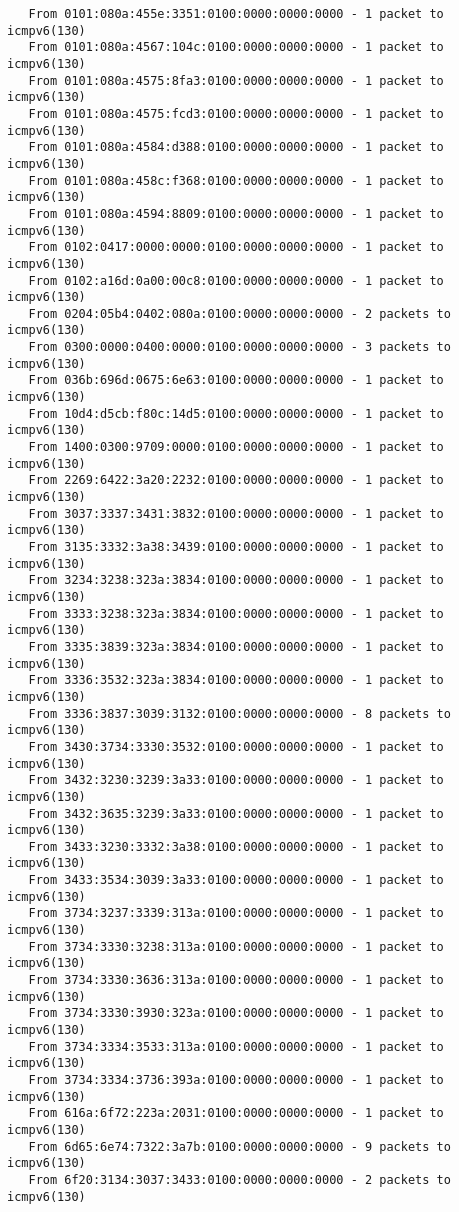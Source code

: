 \begin{lstlisting}
   From 0101:080a:455e:3351:0100:0000:0000:0000 - 1 packet to icmpv6(130)
   From 0101:080a:4567:104c:0100:0000:0000:0000 - 1 packet to icmpv6(130)
   From 0101:080a:4575:8fa3:0100:0000:0000:0000 - 1 packet to icmpv6(130)
   From 0101:080a:4575:fcd3:0100:0000:0000:0000 - 1 packet to icmpv6(130)
   From 0101:080a:4584:d388:0100:0000:0000:0000 - 1 packet to icmpv6(130)
   From 0101:080a:458c:f368:0100:0000:0000:0000 - 1 packet to icmpv6(130)
   From 0101:080a:4594:8809:0100:0000:0000:0000 - 1 packet to icmpv6(130)
   From 0102:0417:0000:0000:0100:0000:0000:0000 - 1 packet to icmpv6(130)
   From 0102:a16d:0a00:00c8:0100:0000:0000:0000 - 1 packet to icmpv6(130)
   From 0204:05b4:0402:080a:0100:0000:0000:0000 - 2 packets to icmpv6(130)
   From 0300:0000:0400:0000:0100:0000:0000:0000 - 3 packets to icmpv6(130)
   From 036b:696d:0675:6e63:0100:0000:0000:0000 - 1 packet to icmpv6(130)
   From 10d4:d5cb:f80c:14d5:0100:0000:0000:0000 - 1 packet to icmpv6(130)
   From 1400:0300:9709:0000:0100:0000:0000:0000 - 1 packet to icmpv6(130)
   From 2269:6422:3a20:2232:0100:0000:0000:0000 - 1 packet to icmpv6(130)
   From 3037:3337:3431:3832:0100:0000:0000:0000 - 1 packet to icmpv6(130)
   From 3135:3332:3a38:3439:0100:0000:0000:0000 - 1 packet to icmpv6(130)
   From 3234:3238:323a:3834:0100:0000:0000:0000 - 1 packet to icmpv6(130)
   From 3333:3238:323a:3834:0100:0000:0000:0000 - 1 packet to icmpv6(130)
   From 3335:3839:323a:3834:0100:0000:0000:0000 - 1 packet to icmpv6(130)
   From 3336:3532:323a:3834:0100:0000:0000:0000 - 1 packet to icmpv6(130)
   From 3336:3837:3039:3132:0100:0000:0000:0000 - 8 packets to icmpv6(130)
   From 3430:3734:3330:3532:0100:0000:0000:0000 - 1 packet to icmpv6(130)
   From 3432:3230:3239:3a33:0100:0000:0000:0000 - 1 packet to icmpv6(130)
   From 3432:3635:3239:3a33:0100:0000:0000:0000 - 1 packet to icmpv6(130)
   From 3433:3230:3332:3a38:0100:0000:0000:0000 - 1 packet to icmpv6(130)
   From 3433:3534:3039:3a33:0100:0000:0000:0000 - 1 packet to icmpv6(130)
   From 3734:3237:3339:313a:0100:0000:0000:0000 - 1 packet to icmpv6(130)
   From 3734:3330:3238:313a:0100:0000:0000:0000 - 1 packet to icmpv6(130)
   From 3734:3330:3636:313a:0100:0000:0000:0000 - 1 packet to icmpv6(130)
   From 3734:3330:3930:323a:0100:0000:0000:0000 - 1 packet to icmpv6(130)
   From 3734:3334:3533:313a:0100:0000:0000:0000 - 1 packet to icmpv6(130)
   From 3734:3334:3736:393a:0100:0000:0000:0000 - 1 packet to icmpv6(130)
   From 616a:6f72:223a:2031:0100:0000:0000:0000 - 1 packet to icmpv6(130)
   From 6d65:6e74:7322:3a7b:0100:0000:0000:0000 - 9 packets to icmpv6(130)
   From 6f20:3134:3037:3433:0100:0000:0000:0000 - 2 packets to icmpv6(130)

\end{lstlisting}
